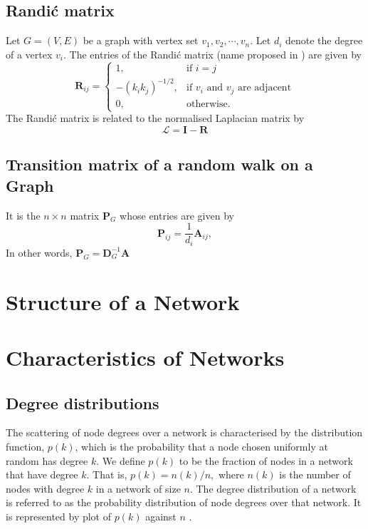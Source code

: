 \documentclass[10pt,a4paper]{article}
\begin{document}
\subsection{Randi\'{c} matrix}
Let $G=(V,E)$ be a graph with vertex set ${v_1,v_2, \cdots, v_n}$. Let $d_i$ denote the degree of a vertex $v_i$. The entries of the Randi\'{c} matrix (name proposed in \citep{bozkurt2010randic}) are given by
\begin{equation*}
\mathbf{R}_{ij} = \begin{cases} 1, &\mbox{if } i = j \\
-(k_ik_j)^{-1/2}, &\mbox{if } v_i \text{ and } v_j \text{ are adjacent} \\ 
0, & \text{otherwise}.
\end{cases}
\end{equation*}
The Randi\'{c} matrix is related to the normalised Laplacian matrix by
\begin{equation}
\mathcal{L} = \mathbf{I} -\mathbf{R}
\end{equation}

\subsection{Transition matrix of a random walk on a Graph}
It is the $n \times n$ matrix $\mathbf{P}_G$ whose entries are given by
\begin{equation}
\mathbf{P}_{ij} = \frac{1}{d_i} \mathbf{A}_{ij},
\end{equation}
In other words, $\mathbf{P}_G = \mathbf{D}_{G} ^ {-1} \mathbf{A}$


\section{Structure of a Network}

\section{Characteristics of Networks}
\subsection{Degree distributions}
The scattering of node degrees over a network is characterised by the distribution function, $p(k)$, which is the probability that a node chosen uniformly at random has degree $k$. We define $p(k)$ to be the fraction of nodes in a network that have degree $k$. That is, $p(k) = n(k)/n,$ where $n(k)$ is the number of nodes with degree $k$ in a network of size $n$. The degree distribution of a network is  referred to as the probability distribution of node degrees over that network. It is represented by plot of $p(k)$ against $n$ \citep{estrada2011structure}. 
\end{document}
